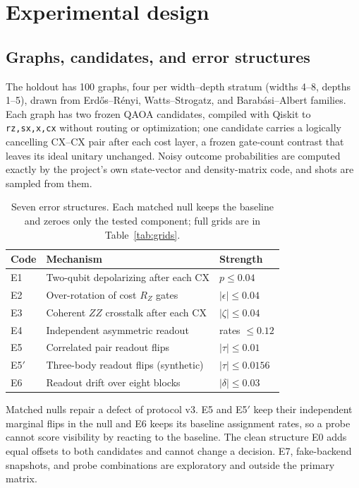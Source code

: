 \documentclass[10pt,twocolumn]{article}
\newcommand{\code}[1]{\texttt{#1}}
\begin{document}
\section{Experimental design}

\subsection{Graphs, candidates, and error structures}

The holdout has 100 graphs, four per width--depth stratum (widths 4--8, depths
1--5), drawn from Erd\H{o}s--R\'enyi, Watts--Strogatz, and Barab\'asi--Albert
families. Each graph has two frozen QAOA candidates, compiled with
Qiskit\cite{javadiabhari2024} to \code{rz,sx,x,cx} without routing or
optimization; one candidate carries a logically cancelling CX--CX pair after
each cost layer, a frozen gate-count contrast that leaves its ideal unitary
unchanged. Noisy outcome probabilities are computed exactly by the project's
own state-vector and density-matrix code, and shots are sampled from them.

\begin{table}[t]
\centering
\caption{Seven error structures. Each matched null keeps the baseline and
zeroes only the tested component; full grids are in
Table~\ref{tab:grids}.}
\label{tab:errors}
\small
\begin{tabularx}{\columnwidth}{@{}lXl@{}}
\toprule
Code & Mechanism & Strength \\
\midrule
E1 & Two-qubit depolarizing after each CX & $p\le0.04$ \\
E2 & Over-rotation of cost $R_Z$ gates & $|\epsilon|\le0.04$ \\
E3 & Coherent $ZZ$ crosstalk after each CX & $|\zeta|\le0.04$ \\
E4 & Independent asymmetric readout & rates $\le0.12$ \\
E5 & Correlated pair readout flips & $|\tau|\le0.01$ \\
E5$'$ & Three-body readout flips (synthetic) & $|\tau|\le0.0156$ \\
E6 & Readout drift over eight blocks & $|\delta|\le0.03$ \\
\bottomrule
\end{tabularx}
\end{table}

Matched nulls repair a defect of protocol v3. E5 and E5$'$ keep their
independent marginal flips in the null and E6 keeps its baseline assignment
rates, so a probe cannot score visibility by reacting to the baseline. The
clean structure E0 adds equal offsets to both candidates and cannot change a
decision. E7, fake-backend snapshots, and probe combinations are exploratory
and outside the primary matrix.
\end{document}

